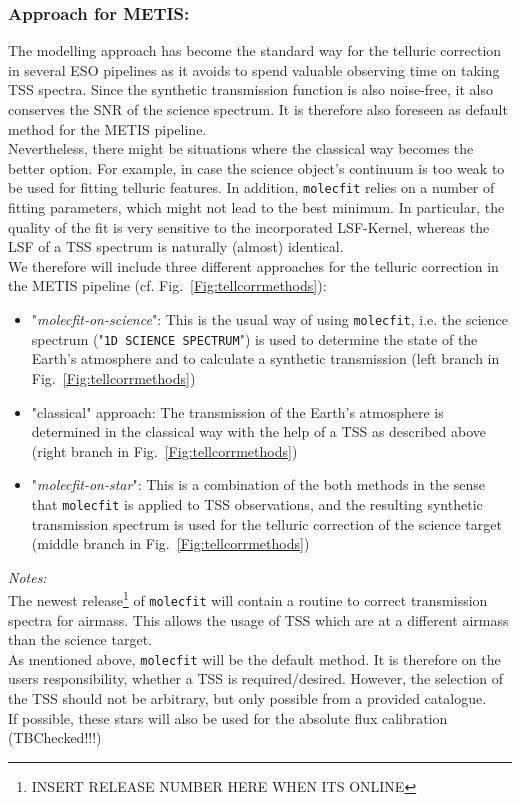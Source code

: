 \subsubsection{Approach for \ac{METIS}:} 
The modelling approach has become the standard way for the telluric correction in several ESO pipelines as it avoids to spend valuable observing time on taking \ac{TSS} spectra. Since the synthetic transmission function is also noise-free, it also conserves the \ac{SNR} of the science spectrum. It is therefore also foreseen as default method for the \ac{METIS} pipeline.\\
Nevertheless, there might be situations where the classical way becomes the better option. For example, in case the science object's continuum is too weak to be used for fitting telluric features. In addition, \texttt{molecfit} relies on a number of fitting parameters, which might not lead to the best minimum. In particular, the quality of the fit is very sensitive to the incorporated \ac{LSF}-Kernel, whereas the \ac{LSF} of a \ac{TSS} spectrum is naturally (almost) identical.\\
We therefore will include three different approaches for the telluric correction in the \ac{METIS} pipeline (cf. Fig.~\ref{Fig:tellcorrmethods}):
\begin{itemize}
    \item "\textit{molecfit-on-science}": This is the usual way of using \texttt{molecfit}, i.e. the science spectrum ("\texttt{1D SCIENCE SPECTRUM}") is used to determine the state of the Earth's atmosphere and to calculate a synthetic transmission (left branch in Fig.~\ref{Fig:tellcorrmethods})
    \item "classical" approach: The transmission of the Earth's atmosphere is determined in the classical way with the help of a \ac{TSS} as described above (right branch in Fig.~\ref{Fig:tellcorrmethods})
    \item "\textit{molecfit-on-star}": This is a combination of the both methods in the sense that \texttt{molecfit} is applied to \ac{TSS} observations, and the resulting synthetic transmission spectrum is used for the telluric correction of the science target  (middle branch in Fig.~\ref{Fig:tellcorrmethods})
\end{itemize}
\textit{Notes:}\\
The newest release\footnote{\color{red}INSERT RELEASE NUMBER HERE WHEN ITS ONLINE\color{black}} of \texttt{molecfit} will contain a routine to correct transmission spectra for airmass. This allows the usage of \ac{TSS} which are at a different airmass than the science target.\\
As mentioned above, \texttt{molecfit} will be the default method. It is therefore on the users responsibility, whether a \ac{TSS} is required/desired. However, the selection of the \ac{TSS} should not be arbitrary, but only possible from a provided catalogue.\\
If possible, these stars will also be used for the absolute flux calibration \color{red}(TBChecked!!!)\color{black}

